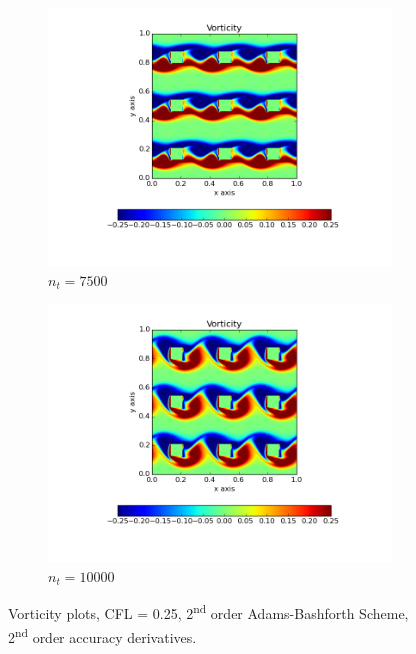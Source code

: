 \documentclass[10pt, a4paper]{article}
\begin{document}
\begin{figure}[htb!]
\begin{subfigure}{.5\textwidth}
  \includegraphics[width=1.1\linewidth, clip=true, trim=1cm 2cm 1cm 1cm]{q4_0003}
  \caption{$n_t = 7500$}
  \label{fig:sub1}
\end{subfigure}%
\begin{subfigure}{.5\textwidth}
  \centering
  \includegraphics[width=1.1\linewidth, clip=true, trim=1cm 2cm 1cm 1cm]{q4_0004}
  \caption{$n_t = 10000$}
  \label{fig:sub2}
\end{subfigure}
\caption{Vorticity plots, CFL = 0.25, 2\textsuperscript{nd} order Adams-Bashforth Scheme, 2\textsuperscript{nd} order accuracy derivatives.}
\label{fig:q4}
\end{figure}


\end{document}
